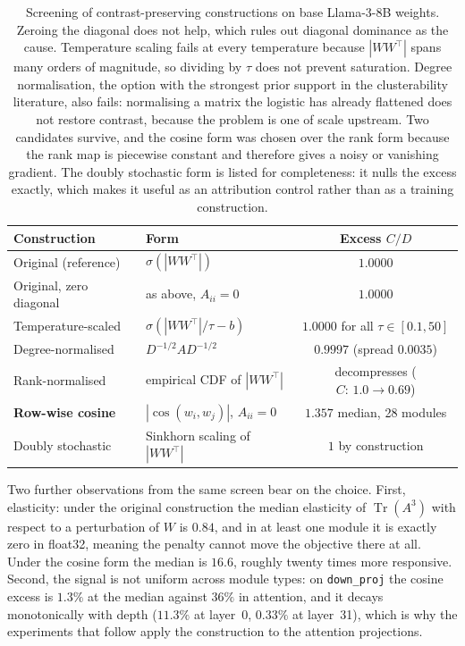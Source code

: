 \documentclass[11pt,a4paper]{article}
\begin{document}
\begin{table}[h]
\centering
\small
\begin{tabular}{llc}
\hline
Construction & Form & Excess $C/D$ \\
\hline
Original (reference) & $\sigma(|WW^\top|)$ & $1.0000$ \\
Original, zero diagonal & as above, $A_{ii}=0$ & $1.0000$ \\
Temperature-scaled & $\sigma(|WW^\top|/\tau - b)$ & $1.0000$ for all $\tau\in[0.1,50]$ \\
Degree-normalised & $D^{-1/2}AD^{-1/2}$ & $0.9997$ (spread $0.0035$) \\
Rank-normalised & empirical CDF of $|WW^\top|$ & decompresses ($C\!:\,1.0\to0.69$) \\
\textbf{Row-wise cosine} & $|\cos(w_i,w_j)|$, $A_{ii}=0$ & $\mathbf{1.357}$ median, 28 modules \\
Doubly stochastic & Sinkhorn scaling of $|WW^\top|$ & $1$ by construction \\
\hline
\end{tabular}
\caption{Screening of contrast-preserving constructions on base Llama-3-8B
weights. Zeroing the diagonal does not help, which rules out diagonal
dominance as the cause. Temperature scaling fails at every temperature
because $|WW^\top|$ spans many orders of magnitude, so dividing by $\tau$ does
not prevent saturation. Degree normalisation, the option with the strongest
prior support in the clusterability literature, also fails: normalising a
matrix the logistic has already flattened does not restore contrast, because
the problem is one of scale upstream. Two candidates survive, and the cosine
form was chosen over the rank form because the rank map is piecewise constant
and therefore gives a noisy or vanishing gradient. The doubly stochastic form
is listed for completeness: it nulls the excess exactly, which makes it useful
as an attribution control rather than as a training construction.}
\label{tab:constructions}
\end{table}

Two further observations from the same screen bear on the choice. First,
elasticity: under the original construction the median elasticity of
$\operatorname{Tr}(A^3)$ with respect to a perturbation of $W$ is $0.84$, and
in at least one module it is exactly zero in float32, meaning the penalty
cannot move the objective there at all. Under the cosine form the median is
$16.6$, roughly twenty times more responsive. Second, the signal is not
uniform across module types: on \texttt{down\_proj} the cosine excess is
$1.3\%$ at the median against $36\%$ in attention, and it decays monotonically
with depth ($11.3\%$ at layer~0, $0.33\%$ at layer~31), which is why the
experiments that follow apply the construction to the attention projections.
\end{document}
